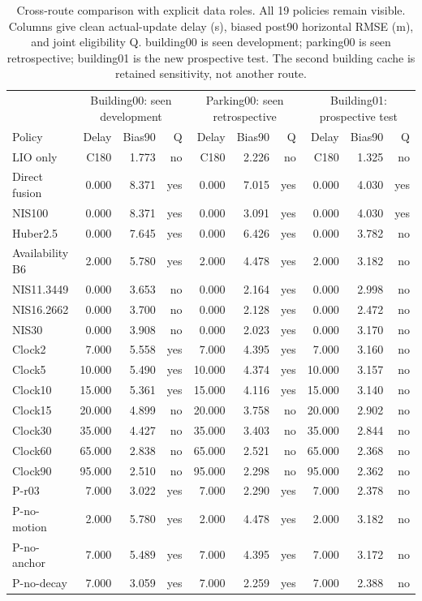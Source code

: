 \begin{table}[t]\centering\small
\caption{Cross-route comparison with explicit data roles. All 19 policies remain visible. Columns give clean actual-update delay (s), biased post90 horizontal RMSE (m), and joint eligibility Q. building00 is seen development; parking00 is seen retrospective; building01 is the new prospective test. The second building cache is retained sensitivity, not another route.}\label{tab:other}
\begin{tabular}{lrrrrrrrrr}\toprule
 & \multicolumn{3}{c}{Building00: seen development} & \multicolumn{3}{c}{Parking00: seen retrospective} & \multicolumn{3}{c}{Building01: prospective test}\\
Policy & Delay & Bias90 & Q & Delay & Bias90 & Q & Delay & Bias90 & Q\\\midrule
LIO only & C180 & 1.773 & no & C180 & 2.226 & no & C180 & 1.325 & no \\
Direct fusion & 0.000 & 8.371 & yes & 0.000 & 7.015 & yes & 0.000 & 4.030 & yes \\
NIS100 & 0.000 & 8.371 & yes & 0.000 & 3.091 & yes & 0.000 & 4.030 & yes \\
Huber2.5 & 0.000 & 7.645 & yes & 0.000 & 6.426 & yes & 0.000 & 3.782 & no \\
Availability B6 & 2.000 & 5.780 & yes & 2.000 & 4.478 & yes & 2.000 & 3.182 & no \\
NIS11.3449 & 0.000 & 3.653 & no & 0.000 & 2.164 & yes & 0.000 & 2.998 & no \\
NIS16.2662 & 0.000 & 3.700 & no & 0.000 & 2.128 & yes & 0.000 & 2.472 & no \\
NIS30 & 0.000 & 3.908 & no & 0.000 & 2.023 & yes & 0.000 & 3.170 & no \\
Clock2 & 7.000 & 5.558 & yes & 7.000 & 4.395 & yes & 7.000 & 3.160 & no \\
Clock5 & 10.000 & 5.490 & yes & 10.000 & 4.374 & yes & 10.000 & 3.157 & no \\
Clock10 & 15.000 & 5.361 & yes & 15.000 & 4.116 & yes & 15.000 & 3.140 & no \\
Clock15 & 20.000 & 4.899 & no & 20.000 & 3.758 & no & 20.000 & 2.902 & no \\
Clock30 & 35.000 & 4.427 & no & 35.000 & 3.403 & no & 35.000 & 2.844 & no \\
Clock60 & 65.000 & 2.838 & no & 65.000 & 2.521 & no & 65.000 & 2.368 & no \\
Clock90 & 95.000 & 2.510 & no & 95.000 & 2.298 & no & 95.000 & 2.362 & no \\
P-r03 & 7.000 & 3.022 & yes & 7.000 & 2.290 & yes & 7.000 & 2.378 & no \\
P-no-motion & 2.000 & 5.780 & yes & 2.000 & 4.478 & yes & 2.000 & 3.182 & no \\
P-no-anchor & 7.000 & 5.489 & yes & 7.000 & 4.395 & yes & 7.000 & 3.172 & no \\
P-no-decay & 7.000 & 3.059 & yes & 7.000 & 2.259 & yes & 7.000 & 2.388 & no \\
\bottomrule\end{tabular}\end{table}
